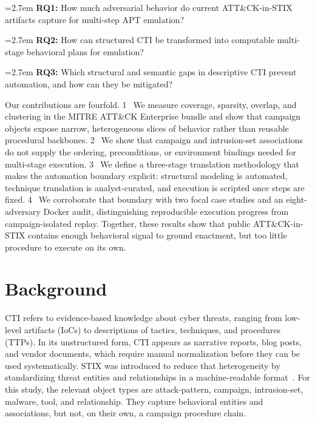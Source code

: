 \documentclass[sigconf]{acmart}
\newcommand{\stix}{STIX\xspace}
\newcommand{\mitre}{MITRE\xspace}
\newcommand{\attack}{ATT\&CK\xspace}
\newcommand{\stepone}{\textcircled{\scriptsize 1}}
\newcommand{\steptwo}{\textcircled{\scriptsize 2}}
\newcommand{\stepthree}{\textcircled{\scriptsize 3}}
\newcommand{\stepfour}{\textcircled{\scriptsize 4}}
\begin{document}
\noindent\hangindent=2.7em
\textbf{RQ1:} How much adversarial behavior do current \attack{}-in-\stix{} artifacts capture for multi-step APT emulation?

\noindent\hangindent=2.7em
\textbf{RQ2:} How can structured CTI be transformed into computable multi-stage behavioral plans for emulation?

\noindent\hangindent=2.7em
\textbf{RQ3:} Which structural and semantic gaps in descriptive CTI prevent automation, and how can they be mitigated?

Our contributions are fourfold. \stepone\ We measure coverage, sparsity, overlap, and clustering in the \mitre{} \attack{} Enterprise bundle and show that campaign objects expose narrow, heterogeneous slices of behavior rather than reusable procedural backbones. \steptwo\ We show that campaign and intrusion-set associations do not supply the ordering, preconditions, or environment bindings needed for multi-stage execution. \stepthree\ We define a three-stage translation methodology that makes the automation boundary explicit: structural modeling is automated, technique translation is analyst-curated, and execution is scripted once steps are fixed. \stepfour\ We corroborate that boundary with two focal case studies and an eight-adversary Docker audit, distinguishing reproducible execution progress from campaign-isolated replay. Together, these results show that public \attack{}-in-\stix{} contains enough behavioral signal to ground enactment, but too little procedure to execute on its own.

\section{Background}
\label{sec:background}

CTI refers to evidence-based knowledge about cyber threats, ranging from low-level artifacts (IoCs) to descriptions of tactics, techniques, and procedures (TTPs). In its unstructured form, CTI appears as narrative reports, blog posts, and vendor documents, which require manual normalization before they can be used systematically. \stix{} was introduced to reduce that heterogeneity by standardizing threat entities and relationships in a machine-readable format~\cite{stixspec}. For this study, the relevant object types are attack-pattern, campaign, intrusion-set, malware, tool, and relationship. They capture behavioral entities and associations, but not, on their own, a campaign procedure chain.
\end{document}
